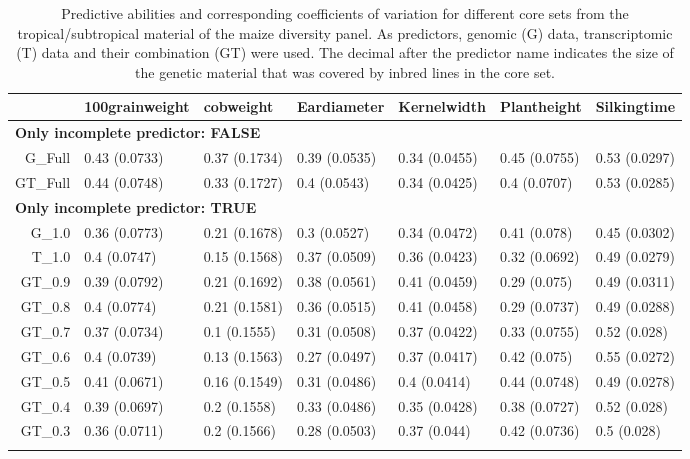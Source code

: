 \documentclass[12pt,titlepage]{article}
\begin{document}
\begin{table}[ht]
\centering
\caption{Predictive abilities and corresponding coefficients of variation for different core sets from the tropical/subtropical material of the maize diversity panel. As predictors, genomic (G) data, transcriptomic (T) data and their combination (GT) were used. The decimal after the predictor name indicates the size of the genetic material that was covered by inbred lines in the core set.} 
\begin{tabular}{rllllll}
  \toprule
 & 100grainweight & cobweight & Eardiameter & Kernelwidth & Plantheight & Silkingtime \\ 
  \midrule
\multicolumn{6}{l}{{\bfseries Only incomplete predictor: FALSE}}\\
G\_Full & 0.43 (0.0733) & 0.37 (0.1734) & 0.39 (0.0535) & 0.34 (0.0455) & 0.45 (0.0755) & 0.53 (0.0297) \\ 
  GT\_Full & 0.44 (0.0748) & 0.33 (0.1727) & 0.4 (0.0543) & 0.34 (0.0425) & 0.4 (0.0707) & 0.53 (0.0285) \\ 
   \midrule
\multicolumn{6}{l}{{\bfseries Only incomplete predictor: TRUE}}\\
G\_1.0 & 0.36 (0.0773) & 0.21 (0.1678) & 0.3 (0.0527) & 0.34 (0.0472) & 0.41 (0.078) & 0.45 (0.0302) \\ 
  T\_1.0 & 0.4 (0.0747) & 0.15 (0.1568) & 0.37 (0.0509) & 0.36 (0.0423) & 0.32 (0.0692) & 0.49 (0.0279) \\ 
  GT\_0.9 & 0.39 (0.0792) & 0.21 (0.1692) & 0.38 (0.0561) & 0.41 (0.0459) & 0.29 (0.075) & 0.49 (0.0311) \\ 
  GT\_0.8 & 0.4 (0.0774) & 0.21 (0.1581) & 0.36 (0.0515) & 0.41 (0.0458) & 0.29 (0.0737) & 0.49 (0.0288) \\ 
  GT\_0.7 & 0.37 (0.0734) & 0.1 (0.1555) & 0.31 (0.0508) & 0.37 (0.0422) & 0.33 (0.0755) & 0.52 (0.028) \\ 
  GT\_0.6 & 0.4 (0.0739) & 0.13 (0.1563) & 0.27 (0.0497) & 0.37 (0.0417) & 0.42 (0.075) & 0.55 (0.0272) \\ 
  GT\_0.5 & 0.41 (0.0671) & 0.16 (0.1549) & 0.31 (0.0486) & 0.4 (0.0414) & 0.44 (0.0748) & 0.49 (0.0278) \\ 
  GT\_0.4 & 0.39 (0.0697) & 0.2 (0.1558) & 0.33 (0.0486) & 0.35 (0.0428) & 0.38 (0.0727) & 0.52 (0.028) \\ 
  GT\_0.3 & 0.36 (0.0711) & 0.2 (0.1566) & 0.28 (0.0503) & 0.37 (0.044) & 0.42 (0.0736) & 0.5 (0.028) \\ 
   \bottomrule
\multicolumn{6}{l}{}\\
\end{tabular}
\end{table}
\end{document}
